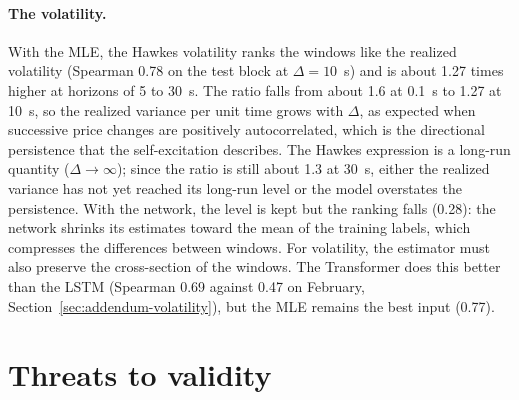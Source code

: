 \paragraph{The volatility.} With the MLE, the Hawkes volatility ranks the windows like the
realized volatility (Spearman 0.78 on the test block at \(\Delta=10\)~s) and is about 1.27
times higher at horizons of 5 to 30~s. The ratio falls from about 1.6 at 0.1~s to 1.27 at
10~s, so the realized variance per unit time grows with \(\Delta\), as expected when
successive price changes are positively autocorrelated, which is the directional persistence
that the self-excitation describes. The Hawkes expression is a long-run quantity
(\(\Delta\to\infty\)); since the ratio is still about 1.3 at 30~s, either the realized
variance has not yet reached its long-run level or the model overstates the persistence. With the network,
the level is kept but the ranking falls (0.28): the network shrinks its estimates toward the
mean of the training labels, which compresses the differences between windows. For
volatility, the estimator must also preserve the cross-section of the windows. The Transformer does this better than the LSTM
(Spearman 0.69 against 0.47 on February, Section~\ref{sec:addendum-volatility}), but the MLE
remains the best input (0.77).

\section{Threats to validity}

